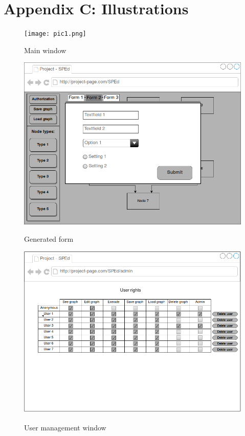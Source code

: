 \documentclass{article}
\begin{document}
	\section*{Appendix C: Illustrations}
	\begin{figure}[h!]
	    \texttt{[image: pic1.png]}
	    \label{pic1}
	    \caption{Main window}
	\end{figure}
	\begin{figure}[h!]
	    \includegraphics[width=\textwidth]{pic2.png}
	    \label{pic2}
	    \caption{Generated form}
	\end{figure}
	\begin{figure}[h!]
	    \includegraphics[width=\textwidth]{pic3.png}
	    \label{pic3}
	    \caption{User management window}
	\end{figure}
\end{document}
